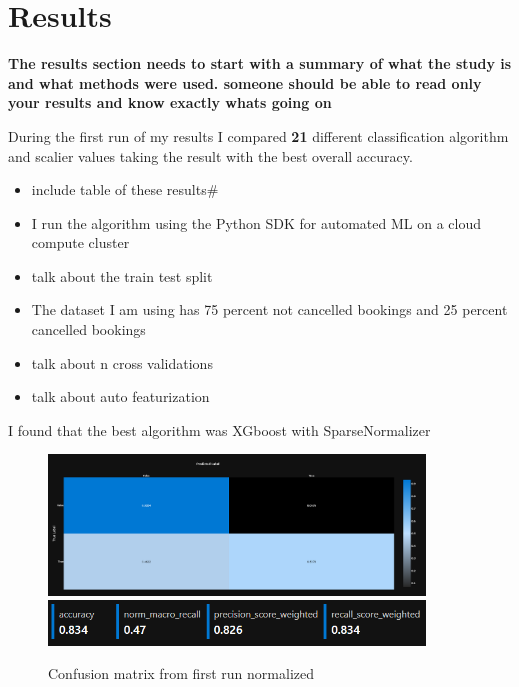 \chapter{Results}
\label{ch:results}

\textbf{The results section needs to start with a summary of what the study is and what methods were used. someone should be able to read only your results and know exactly whats going on}

During the first run of my results I compared \textbf{21} different classification algorithm and scalier values taking the result with the best overall accuracy.
\begin{itemize}
\item include table of these results#
\item I run the algorithm using the Python SDK for automated ML on a cloud compute cluster
\item talk about the train test split
\item The dataset I am using has 75 percent not cancelled bookings and 25 percent cancelled bookings
\item talk about n cross validations
\item talk about auto featurization
\end{itemize}
I found that the best algorithm was XGboost with SparseNormalizer 

\begin{figure}[hbt!]
 \includegraphics[width=10cm]{figures/azure_ml_confusion_matrix_xg.png}
 \includegraphics[width=10cm]{figures/xg_boost_scores.png}
 \caption{Confusion matrix from first run normalized}
\end{figure}


